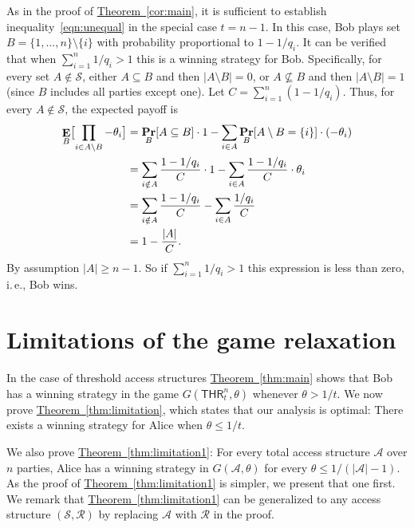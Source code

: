 \documentclass[11pt]{article}
\numberwithin{equation}{section}
\theoremstyle{definition}
\theoremstyle{plain}
\newcommand{\ie}{i.\,e.}
\newcommand{\expref}[2]{\hyperref[#2]{#1~\ref{#2}}}
\DeclareMathOperator\pr{\mathop{\bf Pr}}
\DeclareMathOperator\E{\mathop{\bf E}}
\newcommand{\thr}[2]{\mathsf{THR}_{#1}^{#2}}
\def\calA{\mathcal{A}}
\def\calS{\mathcal{S}}
\def\calR{\mathcal{R}}
\providecommand\abs[1]{\lvert#1\rvert}
\begin{document}
As in the proof of \expref{Theorem}{cor:main}, it is sufficient to establish inequality~\eqref{eqn:unequal} in the special case $t = n - 1$.  In this case, Bob plays set $B = \{1, \dots, n\}\setminus\{i\}$ with probability proportional to $1 - 1/q_i$.    It can be verified that when $\sum_{i=1}^n 1/q_i > 1$ this is a winning strategy for Bob.  
%
Specifically,   for every set $A \not\in \calS$, either $A \subseteq B$ and then $\abs{A\setminus B} = 0$, or $A\not\subseteq B$ and then $\abs{A\setminus B} = 1$ (since $B$ includes all parties except one).  Let $C=\sum_{i=1}^n (1 - 1/q_i)$.  Thus, for every $A\not\in \calS$, the expected payoff is 
\begin{align*}
\label{eqn:analysis_ave}
\E_B\bigl[\prod_{i \in A \setminus B} -\theta_i\bigr] 
&=  \pr_B[A \subseteq B] \cdot 1- \sum_{i\in A} \pr_B[A \setminus B = \{i\}]\cdot (-\theta_i) \notag \\
&= \sum_{i\notin A}\frac{1-1/q_i}{C}  \cdot  1- \sum_{i\in A}\frac{1-1/q_i}{C} \cdot \theta_i \notag \\
& =\sum_{i\notin A}\frac{1-1/q_i}{C}- \sum_{i\in A}\frac{1/q_i}{C} \\
&= 1 - \frac{|A|}{C}.
\end{align*}
By assumption $\abs{A} \geq n-1$. So if $\sum_{i=1}^n 1/q_i > 1$ this expression is less than zero, \ie, Bob wins.



\section{Limitations of the game relaxation}
\label{sec:limitation}

In the case of threshold access structures \expref{Theorem}{thm:main} shows that Bob
has a winning strategy in the game $G(\thr{t}{n}, \theta)$ whenever $\theta >
1/t$.  We now prove \expref{Theorem}{thm:limitation}, which states that our analysis
is optimal:  There exists a winning strategy for Alice when $\theta \leq 1/t$.  

We also prove \expref{Theorem}{thm:limitation1}: For every total access structure $\calA$ over $n$ parties, Alice has a winning strategy in $G(\calA, \theta)$ for every $\theta \leq 1/(\abs{\calA}-1)$.  As the proof of \expref{Theorem}{thm:limitation1} is simpler, we present that one first. We remark that 
\expref{Theorem}{thm:limitation1} can be generalized to any
access structure $(\calS,\calR)$ by replacing $\calA$ with $\calR$ in the proof.
\end{document}
